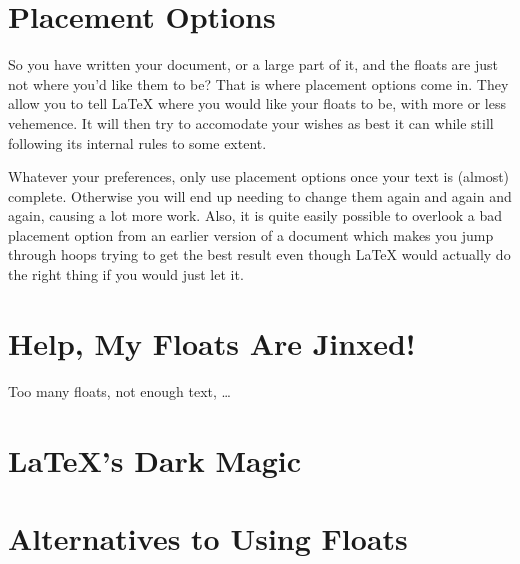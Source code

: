 \documentclass[article,a4paper,oneside,10pt]{memoir}
\begin{document}
\chapter{Placement Options}
\label{chap:placement}

So you have written  your document, or a large part of it,  and the floats are
just not  where you'd like  them to be? That  is where placement  options come
in. They allow you  to tell \LaTeX{} where  you would like your  floats to be,
with more  or less vehemence. It  will then try  to accomodate your  wishes as
best it can while still following its internal rules to some extent.

\textcolor{solarized-red}{Whatever  your   preferences,  only   use  placement
options  once your  text  is  (almost) complete.} Otherwise  you  will end  up
needing  to  change  them again  and  again  and  again,  causing a  lot  more
work. Also, it  is quite easily  possible to  overlook a bad  placement option
from  an earlier  version of  a document  which makes  you jump  through hoops
trying to get the best result even though \LaTeX{} would actually do the right
thing if you would just let it\footnotemark.



\chapter{Help, My Floats Are Jinxed!}
\label{chap:jinxed}

Too many floats, not enough text, \ldots


\chapter{\LaTeX's Dark Magic}
\label{chap:innards}


\chapter{Alternatives to Using Floats}
\label{chap:alternatives}
\end{document}

